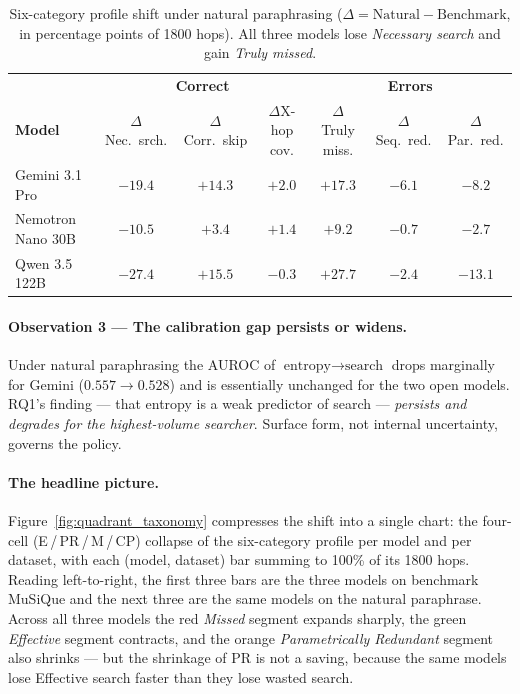 \documentclass[10pt,letterpaper]{article}
\begin{document}
\begin{table}[ht]
\centering
\footnotesize
\caption{Six-category profile shift under natural paraphrasing
($\Delta=\text{Natural}-\text{Benchmark}$, in percentage points of 1800 hops). All three
models lose \emph{Necessary search} and gain \emph{Truly missed}.}
\label{tab:shift}
\setlength{\tabcolsep}{4pt}
\begin{tabular}{l|ccc|ccc}
\toprule
 & \multicolumn{3}{c|}{\textbf{Correct}} & \multicolumn{3}{c}{\textbf{Errors}} \\
\textbf{Model} & $\Delta$Nec.\ srch. & $\Delta$Corr.\ skip & $\Delta$X-hop cov. & $\Delta$Truly miss. & $\Delta$Seq.\ red. & $\Delta$Par.\ red. \\
\midrule
Gemini 3.1 Pro       & $-19.4$ & $+14.3$ & $+2.0$ & $\mathbf{+17.3}$ & $-6.1$ & $-8.2$ \\
Nemotron Nano 30B  & $-10.5$ & $+3.4$  & $+1.4$ & $\mathbf{+9.2}$  & $-0.7$ & $-2.7$ \\
Qwen 3.5 122B      & $-27.4$ & $+15.5$ & $-0.3$ & $\mathbf{+27.7}$ & $-2.4$ & $-13.1$ \\
\bottomrule
\end{tabular}
\end{table}

\paragraph{Observation 3 --- The calibration gap persists or widens.}
Under natural paraphrasing the AUROC of $\text{entropy}\rightarrow\text{search}$ drops
marginally for Gemini ($0.557\to 0.528$) and is essentially unchanged for the two open
models. RQ1's finding --- that entropy is a weak predictor of search --- \emph{persists
and degrades for the highest-volume searcher}. Surface form, not internal uncertainty,
governs the policy.

\paragraph{The headline picture.}
Figure~\ref{fig:quadrant_taxonomy} compresses the shift into a single chart: the
four-cell (E\,/\,PR\,/\,M\,/\,CP) collapse of the six-category profile per model and
per dataset, with each (model, dataset) bar summing to 100\% of its 1800 hops. Reading
left-to-right, the first three bars are the three models on benchmark MuSiQue and the
next three are the same models on the natural paraphrase. Across all three models the
red \emph{Missed} segment expands sharply, the green \emph{Effective} segment
contracts, and the orange \emph{Parametrically Redundant} segment also shrinks --- but
the shrinkage of PR is not a saving, because the same models lose Effective search
faster than they lose wasted search.
\end{document}
